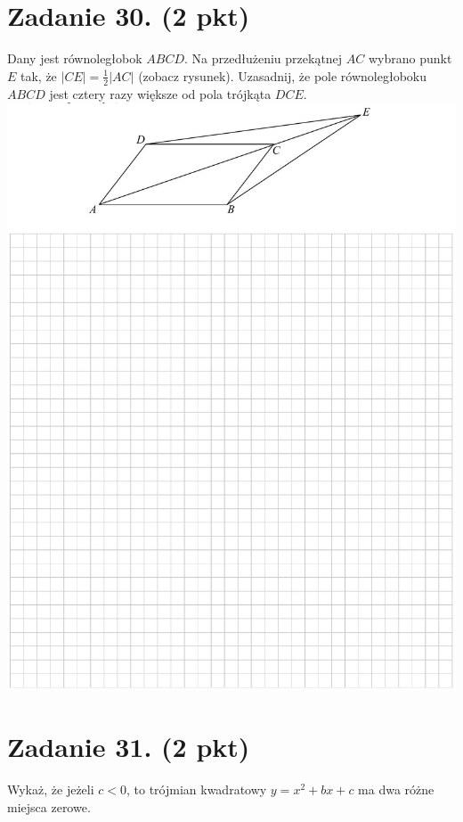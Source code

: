 \documentclass[10pt]{article}
\begin{document}
\section*{Zadanie 30. (2 pkt)}
Dany jest równoległobok \(A B C D\). Na przedłużeniu przekątnej \(A C\) wybrano punkt \(E\) tak, że \(|C E|=\frac{1}{2}|A C|\) (zobacz rysunek). Uzasadnij, że pole równoległoboku \(A B C D\) jest cztery razy większe od pola trójkąta \(D C E\).\\
\includegraphics[max width=\textwidth, center]{2024_11_21_6a8be49478f78d0689cfg-12}

\section*{Zadanie 31. (2 pkt)}
Wykaż, że jeżeli \(c<0\), to trójmian kwadratowy \(y=x^{2}+b x+c\) ma dwa różne miejsca zerowe.
\end{document}
